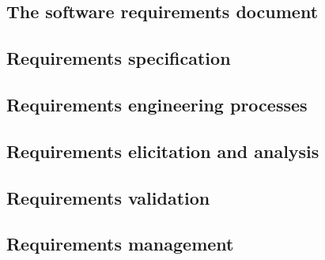\documentclass{article}
\begin{document}
\subsection{The software requirements document}
\subsection{Requirements specification}
\subsection{Requirements engineering processes}
\subsection{Requirements elicitation and analysis}
\subsection{Requirements validation}
\subsection{Requirements management}
\end{document}
